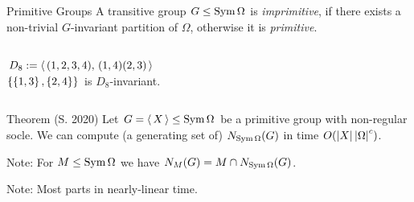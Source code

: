 \documentclass{beamer}
\theoremstyle{plain}
\theoremstyle{definition}
\begin{document}
\begin{frame}{Primitive Groups}
A transitive group $G \leq \operatorname{Sym} \Omega$ is
\emph{imprimitive}, if there exists a non-trivial $G$-invariant partition of
$\Omega$,
otherwise it is \emph{primitive}.

\begin{columns}
\begin{column}{0.5\textwidth}
$D_8 :=  \left\langle \,  (1,2,3,4),\, (1,4)(2,3)  \, \right\rangle $
\\[1em]

$ \left\{   \left\{ 1,3 \right\} ,  \left\{ 2,4 \right\}   \right\} $ is $D_8$-invariant.
\end{column}
\begin{column}{0.3\textwidth}
{
}
\end{column}
\end{columns}
\end{frame}

\begin{frame}%
\begin{block}{Theorem (S. 2020)}
Let $G =  \left\langle \, X \, \right\rangle  \leq \operatorname{Sym} \Omega$ be a primitive group
with non-regular socle.
We can compute (a generating set of) $N_{\operatorname{Sym} \Omega}(G)$
in time $O( \left| X \right|   \left| \Omega \right|  ^ c)$.
\end{block}
\vspace{1em}
\pause
Note: For $M \leq \operatorname{Sym} \Omega$ we have
$N_{M}(G) = M \cap N_{\operatorname{Sym} \Omega}(G)$.

\vspace{1em}
\pause
Note: Most parts in nearly-linear time.

\end{frame}
\end{document}
